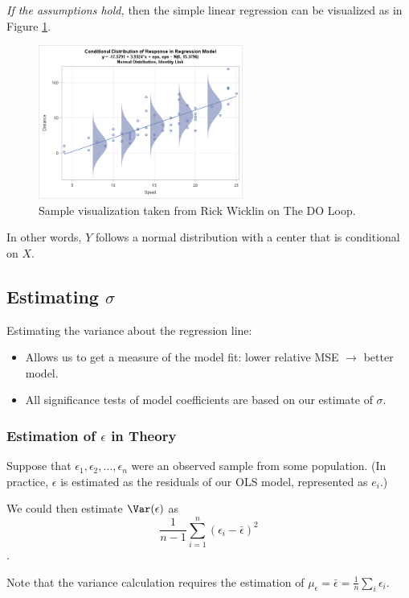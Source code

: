 \documentclass[12pt]{notes}
\begin{document}
\textit{If the assumptions hold,} then the simple linear regression can be visualized as in Figure \ref{wicklin}.

\begin{figure}[H]
\centering
\includegraphics[width = 0.6\textwidth]{figures/module2/normalPic_wicklin.png}
\caption{Sample visualization taken from Rick Wicklin on The DO Loop.}
\label{wicklin}
\end{figure}

In other words, $Y$ follows a normal distribution with a center that is conditional on $X$. 

\subsection*{Estimating $\sigma$}
Estimating the variance about the regression line:
\begin{itemize}
\item Allows us to get a measure of the model fit: lower relative MSE $\rightarrow$ better model. 
\item All significance tests of model coefficients are based on our estimate of $\sigma$. 
\end{itemize} 

\subsubsection*{Estimation of $\epsilon$ in Theory}
Suppose that $\epsilon_1, \epsilon_2, \ldots, \epsilon_n$ were an observed sample from some population. (In practice, $\epsilon$ is estimated as the residuals of our OLS model, represented as $e_i$.)

\nspace
We could then estimate $\Var(\epsilon)$ as 
\[\frac{1}{n-1}\sum_{i=1}^n\left(\epsilon_i - \bar{\epsilon}\right)^2\].

\nspace
Note that the variance calculation requires the estimation of $\mu_\epsilon = \bar{\epsilon} = \frac{1}{n}\sum_i\epsilon_i.$
\end{document}
